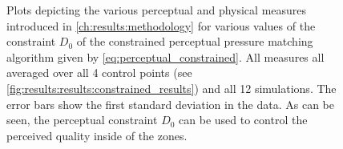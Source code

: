 \begin{figure}[p]
{}
\caption{Plots depicting the various perceptual and physical measures introduced in \autoref{ch:results:methodology} for
various values of the constraint $D_0$ of the constrained perceptual pressure matching algorithm 
given by \autoref{eq:perceptual_constrained}.
All measures all averaged over all 4 control points (see \autoref{fig:results:results:constrained_results}) 
and all 12 simulations.
The error bars show the first standard deviation in the data.
As can be seen, the perceptual constraint $D_0$ can be used to control the perceived quality inside of the zones.}
\label{fig:results:results:constrained_results}
\end{figure}
